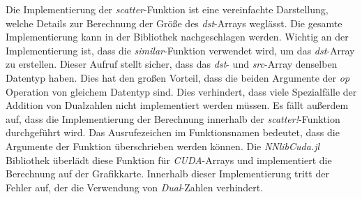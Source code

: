 Die Implementierung der \textit{scatter}-Funktion ist eine vereinfachte Darstellung, 
welche Details zur Berechnung der Größe des \textit{dst}-Arrays weglässt.
Die gesamte Implementierung kann in der  Bibliothek \cite{nnlib} nachgeschlagen werden.
Wichtig an der Implementierung ist, dass die \textit{similar}-Funktion verwendet wird, um das
\textit{dst}-Array zu erstellen.
Dieser Aufruf stellt sicher, dass das \textit{dst}- und \textit{src}-Array denselben Datentyp haben.
Dies hat den großen Vorteil, 
dass die beiden Argumente der \textit{op} Operation von gleichem Datentyp sind.
Dies verhindert, 
dass viele Spezialfälle der Addition von Dualzahlen nicht implementiert werden müssen.
Es fällt außerdem auf, dass die Implementierung der Berechnung innerhalb der \textit{scatter!}-Funktion
durchgeführt wird.
Das Ausrufezeichen im Funktionsnamen bedeutet, dass die Argumente der Funktion überschrieben werden können.
Die \textit{NNlibCuda.jl} \cite{nnlibcuda} Bibliothek überlädt diese Funktion für \textit{CUDA}-Arrays und
implementiert die Berechnung auf der Grafikkarte.
Innerhalb dieser Implementierung tritt der Fehler auf, der die Verwendung von \textit{Dual}-Zahlen
verhindert.